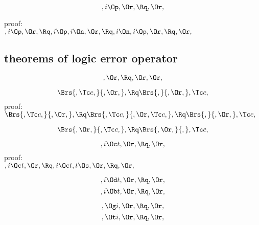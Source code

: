 \[,i \Op, \Or, \Rq ,\Or,\]

\bigskip
proof:\\
\begin{math} 
,i \Op, \Or, \\\\
\Rq,i \Op, i \On, \Or, \\\\
\Rq,i \On, i \Op, \Or, \\\\
\Rq, \Or,
\end{math}
\bigskip


\subsection{theorems of logic error operator}

\[, \Or, \Rq , \Or, \Or,\]


\[\Brs{,\Tc c,}{,\Or,} , \Rq \Brs{,}{,\Or,},\Tc c,\]
\bigskip
proof:\\
\begin{math} 
 \Brs{,\Tc c,}{,\Or,} ,\\\\
\Rq \Brs{,\Tc c,}{,\Or,\Tc c,} , \\\\
\Rq \Brs{,}{,\Or,} ,\Tc c,
\end{math}
\bigskip



\[\Brs{,\Or,} {,\Tc c,}, \Rq \Brs{,\Or,}{,},\Tc c,\]


\[,i \Oc t, \Or, \Rq ,\Or,\]
\bigskip
proof:\\
\begin{math} 
,i \Oc t, \Or,\\\\
\Rq ,i \Oc t,  t \Os, \Or, \\\\
\Rq ,\Or,
\end{math}
\bigskip


\[,i \Od t, \Or, \Rq ,\Or,\]
\[,i \Ob t, \Or, \Rq ,\Or,\]

\[, \Og i, \Or, \Rq ,\Or,\]
\[, \Ot i, \Or, \Rq ,\Or,\]



\newpage


